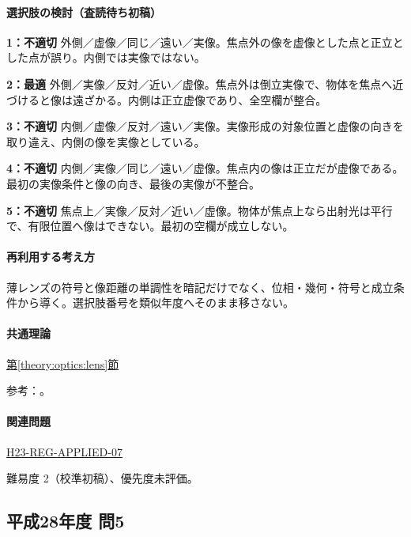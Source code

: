\paragraph{選択肢の検討（査読待ち初稿）}\mbox{}\par

\noindent\textbf{1：不適切} 外側／虚像／同じ／遠い／実像。焦点外の像を虚像とした点と正立とした点が誤り。内側では実像ではない。\par

\noindent\textbf{2：最適} 外側／実像／反対／近い／虚像。焦点外は倒立実像で、物体を焦点へ近づけると像は遠ざかる。内側は正立虚像であり、全空欄が整合。\par

\noindent\textbf{3：不適切} 内側／虚像／反対／遠い／実像。実像形成の対象位置と虚像の向きを取り違え、内側の像を実像としている。\par

\noindent\textbf{4：不適切} 内側／実像／同じ／遠い／虚像。焦点内の像は正立だが虚像である。最初の実像条件と像の向き、最後の実像が不整合。\par

\noindent\textbf{5：不適切} 焦点上／実像／反対／近い／虚像。物体が焦点上なら出射光は平行で、有限位置へ像はできない。最初の空欄が成立しない。\par

\paragraph{再利用する考え方} 薄レンズの符号と像距離の単調性を暗記だけでなく、位相・幾何・符号と成立条件から導く。選択肢番号を類似年度へそのまま移さない。

\paragraph{共通理論} \hyperref[theory:optics:lens]{第\ref*{theory:optics:lens}節}

\par 参考：\cite{os_lens}。

\paragraph{関連問題} \hyperref[q:h23-reg-applied-07]{H23-REG-APPLIED-07}

\par 難易度 2（校準初稿）、優先度未評価。

\subsection{平成28年度 問5}
\label{q:h28-reg-applied-05}


